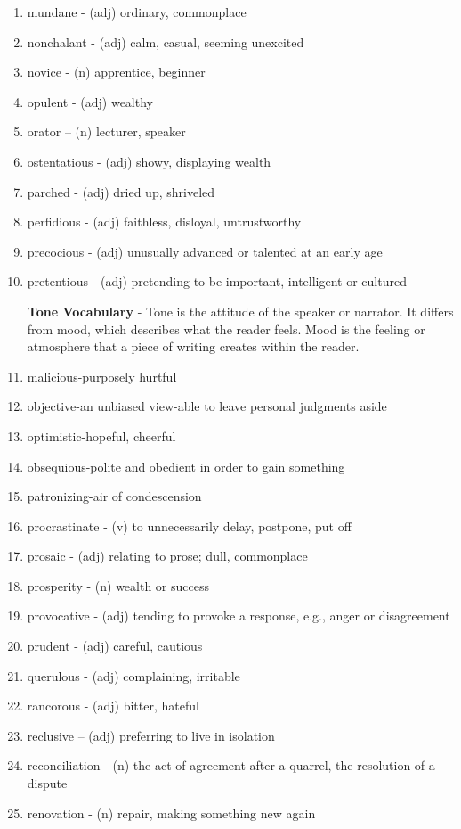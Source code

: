 \begin{enumerate}
\bigskip
\item mundane - (adj) ordinary, commonplace
\item nonchalant - (adj) calm, casual, seeming unexcited
\item novice - (n) apprentice, beginner
\item opulent - (adj) wealthy
\item orator – (n) lecturer, speaker
\item ostentatious - (adj) showy, displaying wealth
\item parched - (adj) dried up, shriveled
\item perfidious - (adj) faithless, disloyal, untrustworthy
\item precocious - (adj) unusually advanced or talented at an early age
\item pretentious - (adj) pretending to be important, intelligent or cultured

\bigskip
\textbf{Tone Vocabulary} - Tone is the attitude of the speaker or narrator.  It differs from mood, which describes what the reader feels.  Mood is the feeling or atmosphere that a piece of writing creates within the reader.  

\bigskip
\item malicious-purposely hurtful
\item objective-an unbiased view-able to leave personal judgments aside
\item optimistic-hopeful, cheerful
\item obsequious-polite and obedient in order to gain something
\item patronizing-air of condescension 

\bigskip
\item procrastinate - (v) to unnecessarily delay, postpone, put off
\item prosaic - (adj) relating to prose; dull, commonplace
\item prosperity - (n) wealth or success
\item provocative - (adj) tending to provoke a response, e.g., anger or disagreement
\item prudent - (adj) careful, cautious
\item querulous - (adj) complaining, irritable
\item rancorous - (adj) bitter, hateful
\item reclusive – (adj) preferring to live in isolation
\item reconciliation - (n) the act of agreement after a quarrel, the resolution of a dispute
\item renovation - (n) repair, making something new again


\end{enumerate}
